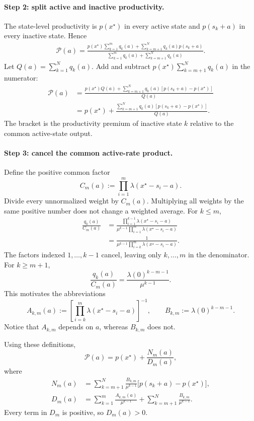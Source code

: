 \documentclass[11pt]{article}
\theoremstyle{tutorial}
\theoremstyle{remark}
\newcommand{\1}{\mathbb{I}}
\newcommand{\calP}{\mathcal{P}}
\begin{document}
\paragraph{Step 2: split active and inactive productivity.}
The state-level productivity is $p(x^\star)$ in every active state and $p(s_k+a)$ in every inactive
state.  Hence
\begin{align*}
\calP(a)
=\frac{
p(x^\star)\sum_{k=1}^m q_k(a)
+\sum_{k=m+1}^Nq_k(a)p(s_k+a)}
{\sum_{k=1}^m q_k(a)+\sum_{k=m+1}^Nq_k(a)}.
\end{align*}
Let $Q(a)=\sum_{k=1}^Nq_k(a)$.  Add and subtract
$p(x^\star)\sum_{k=m+1}^Nq_k(a)$ in the numerator:
\begin{align*}
\calP(a)
&=\frac{p(x^\star)Q(a)
+\sum_{k=m+1}^Nq_k(a)[p(s_k+a)-p(x^\star)]}{Q(a)}\\
&=p(x^\star)+
\frac{\sum_{k=m+1}^Nq_k(a)[p(s_k+a)-p(x^\star)]}{Q(a)}.
\end{align*}
The bracket is the productivity premium of inactive state $k$ relative to the common active-state output.

\paragraph{Step 3: cancel the common active-rate product.}
Define the positive common factor
\[
  C_m(a):=\prod_{i=1}^m\lambda(x^\star-s_i-a).
\]
Divide every unnormalized weight by $C_m(a)$.  Multiplying all weights by the same positive number does not
change a weighted average.  For $k\le m$,
\begin{align*}
\frac{q_k(a)}{C_m(a)}
&=\frac{\prod_{i=1}^{k-1}\lambda(x^\star-s_i-a)}
{\mu^{k-1}\prod_{i=1}^{m}\lambda(x^\star-s_i-a)}\\
&=\frac{1}{\mu^{k-1}\prod_{i=k}^{m}\lambda(x^\star-s_i-a)}.
\end{align*}
The factors indexed $1,\ldots,k-1$ cancel, leaving only $k,\ldots,m$ in the denominator.  For $k\ge m+1$,
\[
  \frac{q_k(a)}{C_m(a)}
  =\frac{\lambda(0)^{k-m-1}}{\mu^{k-1}}.
\]
This motivates the abbreviations
\[
 A_{k,m}(a):=\left[\prod_{i=k}^{m}\lambda(x^\star-s_i-a)\right]^{-1},
 \qquad
 B_{k,m}:=\lambda(0)^{k-m-1}.
\]
Notice that $A_{k,m}$ depends on $a$, whereas $B_{k,m}$ does not.

Using these definitions,
\begin{equation}
\boxed{\calP(a)=p(x^\star)+\frac{N_m(a)}{D_m(a)},}
\label{eq:P-N-over-D}
\end{equation}
where
\begin{align*}
N_m(a)&=\sum_{k=m+1}^{N}\frac{B_{k,m}}{\mu^{k-1}}
       \bigl[p(s_k+a)-p(x^\star)\bigr],\\
D_m(a)&=\sum_{k=1}^{m}\frac{A_{k,m}(a)}{\mu^{k-1}}
       +\sum_{k=m+1}^{N}\frac{B_{k,m}}{\mu^{k-1}}.
\end{align*}
Every term in $D_m$ is positive, so $D_m(a)>0$.
\end{document}
